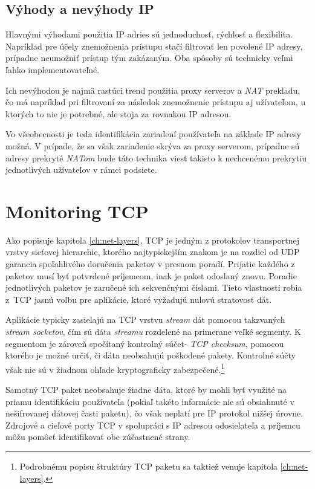 \documentclass[
  printed, %
  table,   %
  lof,     %
  nolot,   %
  nocover
]{fithesis3}
\begin{document}
\subsection{Výhody a nevýhody IP}
Hlavnými výhodami použitia IP adries sú jednoduchosť, rýchlosť a flexibilita.
Napríklad pre účely znemožnenia prístupu stačí filtrovať len povolené IP
adresy, prípadne neumožniť prístup tým zakázaným. Oba spôsoby sú technicky veľmi
ľahko implementovateľné.

Ich nevýhodou je najmä rastúci trend použitia proxy serverov a \textit{NAT}
prekladu, čo má napríklad pri filtrovaní za následok znemožnenie prístupu aj
užívateľom, u ktorých to nie je potrebné, ale stoja za rovnakou IP adresou.

Vo všeobecnosti je teda identifikácia zariadení používateľa na základe IP
adresy možná. V prípade, že sa však zariadenie skrýva za proxy serverom,
prípadne sú adresy prekryté \textit{NATom} bude táto technika viesť takisto k
nechcenému prekrytiu jednotlivých užívateľov v rámci podsiete.

\section{Monitoring TCP}
Ako popisuje kapitola \ref{ch:net-layers}, TCP
je jedným z protokolov transportnej
vrstvy sieťovej hierarchie, ktorého najtypickejším znakom je na rozdiel
od UDP garancia spoľahlivého doručenia paketov v presnom poradí. Prijatie
každého z paketov musí byť potvrdené príjemcom, inak je paket odoslaný znovu.
Poradie jednotlivých paketov je zaručené ich sekvenčnými číslami. Tieto 
vlastnosti robia z~TCP jasnú voľbu pre aplikácie, ktoré vyžadujú nulovú
stratovosť dát. 

Aplikácie typicky zasielajú na TCP vrstvu \textit{stream} dát
pomocou takzvaných \textit{stream socketov}, čím sú dáta \textit{streamu}
rozdelené na primerane veľké segmenty. K segmentom je zároveň spočítaný
kontrolný súčet- \textit{TCP checksum}, pomocou ktorého je možné určiť, či
dáta neobsahujú poškodené pakety. Kontrolné súčty však nie sú v žiadnom ohľade
kryptograficky zabezpečené.\footnote{Podrobnému popisu štruktúry TCP paketu sa
taktiež venuje kapitola \ref{ch:net-layers}.}

Samotný TCP paket neobsahuje žiadne dáta, ktoré by mohli byť využité na priamu
identifikáciu používateľa (pokiaľ takéto informácie nie sú obsiahnuté v
nešifrovanej dátovej časti paketu), čo však neplatí pre IP protokol nižšej
úrovne. Zdrojové a cieľové porty TCP v spolupráci s IP adresou odosielateľa a
príjemcu môžu pomôcť identifikovať obe zúčastnené strany.
\end{document}
